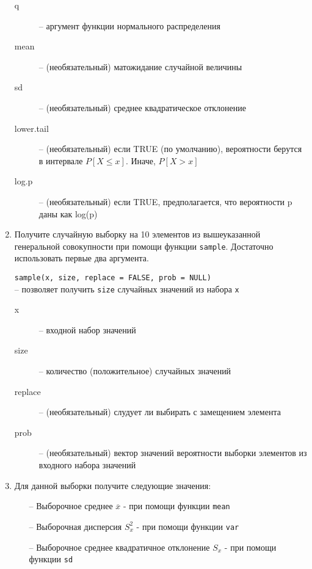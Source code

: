 \begin{enumerate}
\begin{mdframed}[style=BadassFrame]
\begin{description}
                \item[q] -- аргумент функции нормального распределения
                \item[mean] -- (необязательный) матожидание случайной величины
                \item[sd] -- (необязательный) среднее квадратическое отклонение
                \item[lower.tail] -- (необязательный) если TRUE (по умолчанию), вероятности берутся в интервале $P[X \leq x]$. Иначе, $P[X > x]$ 
                \item[log.p] -- (необязательный) если TRUE, предполагается, что вероятности p даны как log(p)
              \end{description}
          \end{mdframed}

    \item Получите случайную выборку на 10 элементов из вышеуказанной генеральной совокупности при помощи функции
          \texttt{sample}. Достаточно использовать первые два аргумента.

          \begin{mdframed}[style=BadassFrame]

              \texttt{sample(x, size, replace = FALSE, prob = NULL)} \\
                -- позволяет получить \texttt{size} случайных значений из набора \texttt{x}
              \begin{description}

                \item[x] -- входной набор значений
                \item[size] -- количество (положительное) случайных значений
                \item[replace] -- (необязательный) слудует ли выбирать с замещением элемента
                \item[prob] -- (необязательный) вектор значений вероятности выборки элементов из входного набора значений
              \end{description}
          \end{mdframed}

    \item Для данной выборки получите следующие значения: 

        \begin{itemize}

            \item[--] Выборочное среднее $\overline{x}$ - при помощи функции \texttt{mean}
            \item[--] Выборочная дисперсия $S_x^2$ - при помощи функции \texttt{var}
            \item[--] Выборочное среднее квадратичное отклонение $S_x$ - при помощи функции \texttt{sd}
        \end{itemize}


\end{enumerate}
